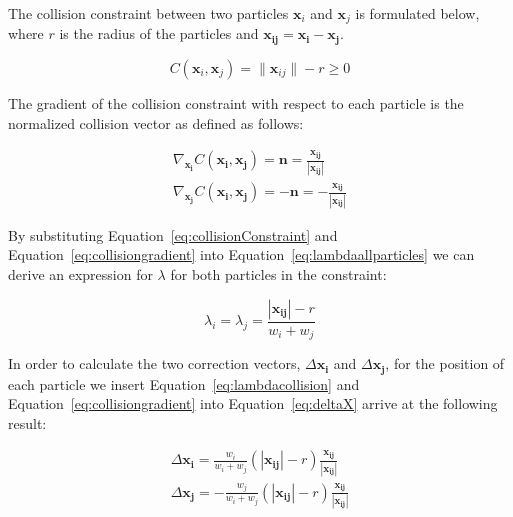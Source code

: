 The collision constraint between two particles $ \mathbf{x}_{i} $ and $
\mathbf{x}_{j} $ is formulated below, where
$ r $ is the radius of the particles and $ \mathbf{x_{ij}} = \mathbf{x_{i}} - \mathbf{x_{j}} $.

\begin{equation} \label{eq:collisionConstraint}
  C(\mathbf{x}_{i}, \mathbf{x}_{j}) = \| \mathbf{x}_{ij} \| - r \geq 0
\end{equation}

The gradient of the collision constraint with respect to each particle is the
normalized collision vector as defined as follows:

\begin{equation}
\label{eq:collisiongradient}
\begin{aligned}
\nabla_{\mathbf{x_{i}}} C(\mathbf{x_{i}}, \mathbf{x_{j}}) = \mathbf{n} = \frac{\mathbf{x_{ij}}}{\left | \mathbf{x_{ij}} \right |}
\\
\nabla_{\mathbf{x_{j}}} C(\mathbf{x_{i}}, \mathbf{x_{j}}) = - \mathbf{n} = - \frac{\mathbf{x_{ij}}}{\left | \mathbf{x_{ij}} \right |}
\end{aligned}
\end{equation}

By substituting Equation~\ref{eq:collisionConstraint} and
Equation~\ref{eq:collisiongradient} into Equation~\ref{eq:lambdaallparticles}
we can derive an expression for $ \lambda $ for both particles in the
constraint:

\begin{equation}
\label{eq:lambdacollision}
\lambda_{i} = \lambda_{j} = \frac{\left | \mathbf{x_{ij}} \right | - r}{w_{i} + w_{j}}
\end{equation}

In order to calculate the two correction vectors, $ \Delta \mathbf{x_{i}} $ and
$ \Delta \mathbf{x_{j}} $, for the position of each particle we insert
Equation~\ref{eq:lambdacollision} and Equation~\ref{eq:collisiongradient} into
Equation~\ref{eq:deltaX} arrive at the following result:

\begin{equation}
\label{eq:collisionresult}
\begin{aligned}
\Delta \mathbf{x_{i}} = \frac{w_{i}}{w_{i} + w_{j}}(\left | \mathbf{x_{ij}} \right | - r) \frac{\mathbf{x_{ij}}}{\left | \mathbf{x_{ij}} \right |}
\\
\Delta \mathbf{x_{j}} = -\frac{w_{j}}{w_{i} + w_{j}}(\left | \mathbf{x_{ij}} \right | - r) \frac{\mathbf{x_{ij}}}{\left | \mathbf{x_{ij}} \right |}
\end{aligned}
\end{equation}

